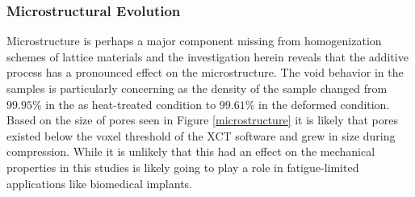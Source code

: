 \subsubsection{Microstructural Evolution}
Microstructure is perhaps a major component missing from homogenization schemes of lattice materials and the investigation herein reveals that the additive process has a pronounced effect on the microstructure. The void behavior in the samples is particularly concerning as the density of the sample changed from $99.95\%$ in the as heat-treated condition to $99.61\%$ in the deformed condition. Based on the size of pores seen in Figure \ref{microstructure} it is likely that pores existed below the voxel threshold of the XCT software and grew in size during compression. While it is unlikely that this had an effect on the mechanical properties in this studies is likely going to play a role in fatigue-limited applications like biomedical implants.

